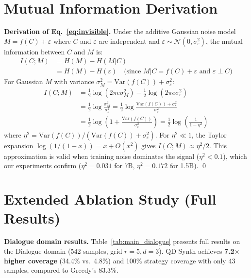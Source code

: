 \documentclass{article}
\begin{document}
\begin{enumerate}[nosep]
\section{Mutual Information Derivation}
\label{sec:proof_mi}

\textbf{Derivation of Eq.~\ref{eq:invisible}.}
Under the additive Gaussian noise model $M = f(C) + \varepsilon$ where $C$ and $\varepsilon$ are independent and $\varepsilon \sim \mathcal{N}(0, \sigma^2_\varepsilon)$, the mutual information between $C$ and $M$ is:
\begin{align*}
I(C; M) &= H(M) - H(M|C) \\
&= H(M) - H(\varepsilon) \quad \text{(since } M|C = f(C) + \varepsilon \text{ and } \varepsilon \perp C\text{)}
\end{align*}
For Gaussian $M$ with variance $\sigma^2_M = \text{Var}(f(C)) + \sigma^2_\varepsilon$:
\begin{align*}
I(C; M) &= \frac{1}{2}\log(2\pi e \sigma^2_M) - \frac{1}{2}\log(2\pi e \sigma^2_\varepsilon) \\
&= \frac{1}{2}\log\frac{\sigma^2_M}{\sigma^2_\varepsilon} = \frac{1}{2}\log\frac{\text{Var}(f(C)) + \sigma^2_\varepsilon}{\sigma^2_\varepsilon} \\
&= \frac{1}{2}\log\left(1 + \frac{\text{Var}(f(C))}{\sigma^2_\varepsilon}\right) = \frac{1}{2}\log\left(\frac{1}{1 - \eta^2}\right)
\end{align*}
where $\eta^2 = \text{Var}(f(C))/(\text{Var}(f(C)) + \sigma^2_\varepsilon)$.
For $\eta^2 \ll 1$, the Taylor expansion $\log(1/(1-x)) = x + O(x^2)$ gives $I(C; M) \approx \eta^2/2$.
This approximation is valid when training noise dominates the signal ($\eta^2 < 0.1$), which our experiments confirm ($\eta^2 = 0.031$ for 7B, $\eta^2 = 0.172$ for 1.5B).
\qed

\section{Extended Ablation Study (Full Results)}
\label{sec:app_ablation}

\textbf{Dialogue domain results.}
Table~\ref{tab:main_dialogue} presents full results on the Dialogue domain (542 samples, grid $r{=}5, d{=}3$).
QD-Synth achieves \textbf{7.2$\times$ higher coverage} (34.4\% vs.\ 4.8\%) and 100\% strategy coverage with only 43 samples, compared to Greedy's 83.3\%.


\end{enumerate}
\end{document}
